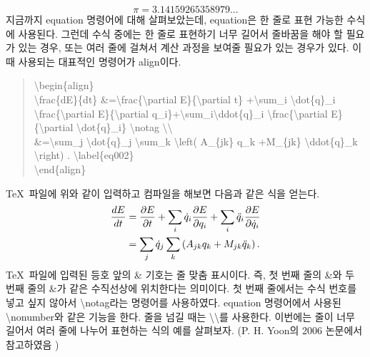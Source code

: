 \documentclass[twoside,11pt]{gshs_thesis}
\begin{document}
\begin{equation}
\pi=3.14159265358979... \nonumber
\end{equation}
지금까지 equation 명령어에 대해 살펴보았는데, equation은 한 줄로 표현 가능한 수식에 사용된다. 그런데 수식 중에는 한 줄로 표현하기 너무 길어서 줄바꿈을 해야 할 필요가 있는 경우, 또는 여러 줄에 걸쳐서 계산 과정을 보여줄 필요가 있는 경우가 있다. 이 때 사용되는 대표적인 명령어가 align이다.
\begin{quote}
{\textbackslash}begin\{align\} \\
{\textbackslash}frac\{dE\}\{dt\} \&={\textbackslash}frac\{{\textbackslash}partial E\}\{{\textbackslash}partial t\} +{\textbackslash}sum\_i {\textbackslash}dot\{q\}\_i {\textbackslash}frac\{{\textbackslash}partial E\}\{{\textbackslash}partial q\_i\}+{\textbackslash}sum\_i{\textbackslash}ddot\{q\}\_i {\textbackslash}frac\{{\textbackslash}partial E\}\{{\textbackslash}partial {\textbackslash}dot\{q\}\_i\} {\textbackslash}notag {\textbackslash}{\textbackslash} \\
\&={\textbackslash}sum\_j {\textbackslash}dot\{q\}\_j {\textbackslash}sum\_k {\textbackslash}left( A\_\{jk\} q\_k +M\_\{jk\} {\textbackslash}ddot\{q\}\_k {\textbackslash}right) . {\textbackslash}label\{eq002\}\\
{\textbackslash}end\{align\}
\end{quote}
\TeX\ 파일에 위와 같이 입력하고 컴파일을 해보면 다음과 같은 식을 얻는다.
\begin{align}
\frac{dE}{dt} &=\frac{\partial E}{\partial t} +\sum_i \dot{q}_i \frac{\partial E}{\partial q_i} +\sum_i \ddot{q}_i \frac{\partial E}{\partial\dot{q}_i} \notag\\
&=\sum_j \dot{q}_j \sum_k \left( A_{jk} q_k +M_{jk} \ddot{q}_k \right). \label{eq002}
\end{align}
\TeX\ 파일에 입력된 등호 앞의 \& 기호는 줄 맞춤 표시이다. 즉, 첫 번째 줄의 \&와 두 번째 줄의 \&가 같은 수직선상에 위치한다는 의미이다. 첫 번째 줄에서는 수식 번호를 넣고 싶지 않아서 {\textbackslash}notag라는 명령어를 사용하였다. equation 명령어에서 사용된 {\textbackslash}nonumber와 같은 기능을 한다. 줄을 넘길 때는 {\textbackslash}{\textbackslash}를 사용한다. 이번에는 줄이 너무 길어서 여러 줄에 나누어 표현하는 식의 예를 살펴보자. (P. H. Yoon의 2006 논문에서 참고하였음 \cite{Yoon06})
\end{document}
